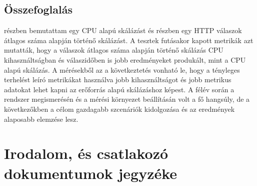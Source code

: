 \documentclass[a4paper,oneside]{article}
\begin{document}
\subsection{Összefoglalás}
\label{sec:osszefoglalas}

 részben bemutattam egy CPU alapú skálázást és
 részben egy HTTP válaszok átlagos száma alapján
történő skálázást.  A tesztek futásakor kapott metrikák azt mutatták, hogy a
válaszok átlagos száma alapján történő skálázás CPU kihasználtságban és
válaszidőben is jobb eredményeket produkált, mint a CPU alapú skálázás.  A
mérésekből az a következtetés vonható le, hogy a tényleges terhelést leíró
metrikákat használva jobb kihasználtságot és jobb metrikus adatokat lehet kapni
az erőforrás alapú skálázáshoz képest.  A félév során a rendszer megismerésén és
a mérési környezet beállításán volt a fő hangsúly, de a következőkben a célom
gazdagabb szcenáriók kidolgozása és az eredmények alaposabb elemzése lesz.

\newpage
 
\section{Irodalom, és csatlakozó dokumentumok jegyzéke}
\label{sec:irod-es-csatl}
\end{document}
